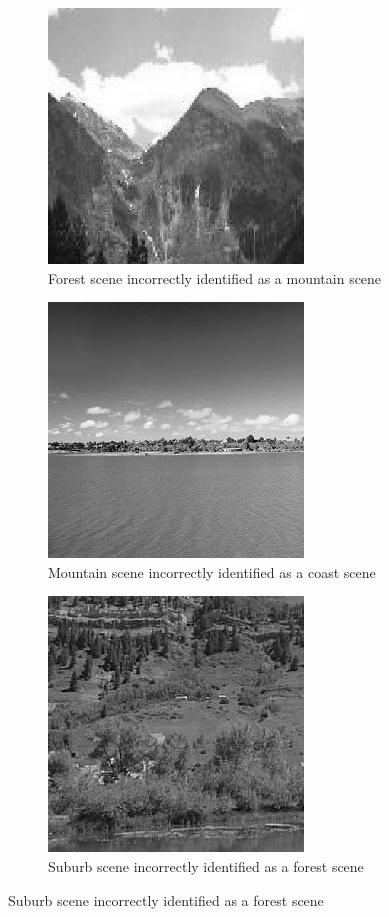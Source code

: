 \begin{homeworkProblem}
  \begin{figure}[H]
    \begin{subfigure}{0.5\textwidth}
      \centering
      \caption{Forest scene incorrectly identified as a mountain scene}
      \includegraphics[width=.5\linewidth]{./images/incept/mountain_forest_1.jpg}
    \end{subfigure}%
    \begin{subfigure}{0.5\textwidth}
      \centering
      \caption{Mountain scene incorrectly identified as a coast scene}
      \includegraphics[width=.5\linewidth]{./images/incept/coast_mountain_1.jpg}
    \end{subfigure}
    \begin{subfigure}{0.5\textwidth}
      \centering
      \caption{Suburb scene incorrectly identified as a forest scene}
      \includegraphics[width=.5\linewidth]{./images/incept/forest_suburb_1.jpg}

\end{subfigure}
\end{figure}
\end{homeworkProblem}
